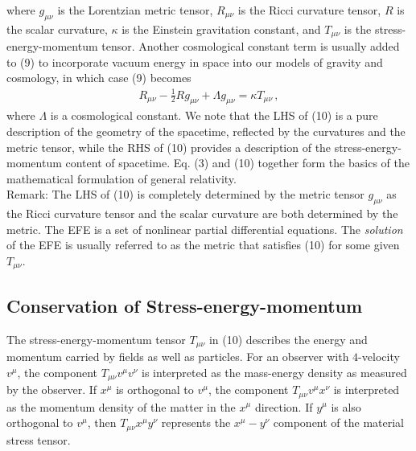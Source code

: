 \documentclass[11pt, onesided]{book}
\theoremstyle{break}
\theoremstyle{break}
\newcommand{\remark}{\color{blue}Remark: \color{black}}
\begin{document}
where $g_{\mu\nu}$ is the Lorentzian metric tensor, $R_{\mu \nu}$ is the Ricci curvature tensor, $R$ is the scalar curvature, $\kappa$ is the Einstein gravitation constant, and $T_{\mu\nu}$ is the stress-energy-momentum tensor. Another cosmological constant term is usually added to (9) to incorporate vacuum energy in space into our models of gravity and cosmology, in which case (9) becomes
\begin{align}
R_{\mu\nu}- \frac{1}{2}Rg_{\mu \nu} + \Lambda g_{\mu\nu}= \kappa T_{\mu\nu}\,,
\end{align}
where $\Lambda$ is a cosmological constant. We note that the LHS of (10) is a pure description of the geometry of the spacetime, reflected by the curvatures and the metric tensor, while the RHS of (10) provides a description of the stress-energy-momentum content of spacetime. Eq. (3) and (10) together form the basics of the mathematical formulation of general relativity.\\

\remark The LHS of (10) is completely determined by the metric tensor $g_{\mu\nu}$ as the Ricci curvature tensor and the scalar curvature are both determined by the metric. The EFE is a set of nonlinear partial differential equations. The \textit{solution} of the EFE is usually referred to as the metric that satisfies (10) for some given $T_{\mu\nu}$. \\

\subsection{Conservation of Stress-energy-momentum}
The stress-energy-momentum tensor $T_{\mu\nu}$ in (10) describes the energy and momentum carried by fields as well as particles. For an observer with $4$-velocity $v^\mu$, the component $T_{\mu\nu}v^\mu v^\nu$ is interpreted as the mass-energy density as measured by the observer. If $x^\mu$ is orthogonal to $v^\mu$, the component $T_{\mu\nu}v^\mu x^\nu$ is interpreted as the momentum density of the matter in the $x^\mu$ direction. If $y^\mu$ is also orthogonal to $v^\mu$, then $T_{\mu\nu}x^\mu y^\nu$ represents the $x^\mu-y^\nu$ component of the material stress tensor. \\
\end{document}
